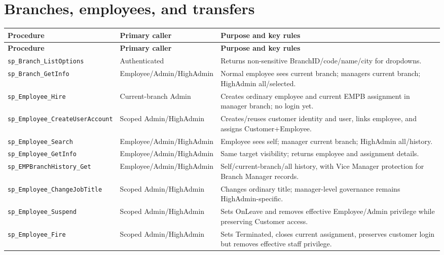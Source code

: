 \documentclass[11pt,a4paper,oneside]{report}
\begin{document}
\section{Branches, employees, and transfers}
\begingroup
\footnotesize
\setlength{\tabcolsep}{4pt}
\renewcommand{\arraystretch}{1.08}
\begin{longtable}{L{0.30\textwidth}L{0.22\textwidth}L{0.41\textwidth}}
\toprule\textbf{Procedure} & \textbf{Primary caller} & \textbf{Purpose and key rules}\\\midrule\endfirsthead
\toprule\textbf{Procedure} & \textbf{Primary caller} & \textbf{Purpose and key rules}\\\midrule\endhead
\nolinkurl{sp_Branch_ListOptions} & Authenticated & Returns non-sensitive BranchID\slash code\slash name\slash city for dropdowns.\\
\nolinkurl{sp_Branch_GetInfo} & Employee\slash Admin\slash HighAdmin & Normal employee sees current branch; managers current branch; HighAdmin all\slash selected.\\
\nolinkurl{sp_Employee_Hire} & Current-branch Admin & Creates ordinary employee and current EMPB assignment in manager branch; no login yet.\\
\nolinkurl{sp_Employee_CreateUserAccount} & Scoped Admin\slash HighAdmin & Creates\slash reuses customer identity and user, links employee, and assigns Customer+Employee.\\
\nolinkurl{sp_Employee_Search} & Employee\slash Admin\slash HighAdmin & Employee sees self; manager current branch; HighAdmin all\slash history.\\
\nolinkurl{sp_Employee_GetInfo} & Employee\slash Admin\slash HighAdmin & Same target visibility; returns employee and assignment details.\\
\nolinkurl{sp_EMPBranchHistory_Get} & Employee\slash Admin\slash HighAdmin & Self\slash current-branch\slash all history, with Vice Manager protection for Branch Manager records.\\
\nolinkurl{sp_Employee_ChangeJobTitle} & Scoped Admin\slash HighAdmin & Changes ordinary title; manager-level governance remains HighAdmin-specific.\\
\nolinkurl{sp_Employee_Suspend} & Scoped Admin\slash HighAdmin & Sets OnLeave and removes effective Employee\slash Admin privilege while preserving Customer access.\\
\nolinkurl{sp_Employee_Fire} & Scoped Admin\slash HighAdmin & Sets Terminated, closes current assignment, preserves customer login but removes effective staff privilege.\\

\end{longtable}
\end{document}
